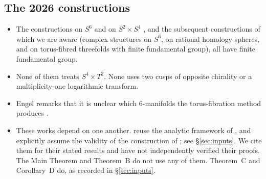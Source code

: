 \documentclass{article}
\theoremstyle{definition}
\theoremstyle{plain}
\begin{document}
\subsection*{The 2026 constructions}
\begin{itemize}
\item The constructions on $S^6$ \cite{AC26,Engel26} and on $S^2\times S^4$
  \cite{GFL26,LLZ26}, and the subsequent constructions of which we are aware (complex
  structures on $S^6$, on rational homology spheres, and on torus-fibred threefolds
  with finite fundamental group), all have finite fundamental group.
\item None of them treats $S^4\times T^2$. None uses two cusps of opposite chirality
  or a multiplicity-one logarithmic transform.
\item Engel remarks that it is unclear which $6$-manifolds the torus-fibration method
  produces \cite[Rem.~8.5]{Engel26}.
\item These works depend on one another. \cite{GFL26} reuse the analytic framework of
  \cite{AC26}, and \cite{LLZ26} explicitly assume the validity of the construction of
  \cite{AC26}; see \S\ref{sec:inputs}. We cite them for their stated results and have
  not independently verified their proofs. The Main Theorem and Theorem~B do not use
  any of them. Theorem~C and Corollary~D do, as recorded in \S\ref{sec:inputs}.
\end{itemize}
\end{document}
